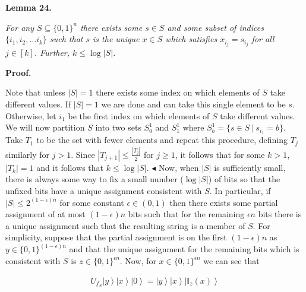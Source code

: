 

\par\medskip\noindent\textbf{
\textbf{Lemma 24}\textbf{.}
}\par



\emph{For any $S\subseteq\{0,1\}^{n}$ there exists some $s\in S$ and some subset of indices $\{i_{1},i_{2},\dots i_{k}\}$ such that $s$ is the unique $x\in S$ which satisfies
$x_{i_{j}}=s_{i_{j}}$ for all $j\in[k]$. Further, $k\leq\log{|S|}$.}\par







\par\medskip\noindent\textbf{Proof.}\par




Note that unless $|S|=1$ there exists some index on which elements of $S$ take different values. If $|S|=1$ we are done and can take this single element to be $s$. Otherwise, let $i_{1}$ be the first index on which elements of $S$ take different values. We will now partition $S$ into two sets $S^{1}_{0}$ and $S^{1}_{1}$ where $S^{1}_{b}=\{s\in S\ |\ s_{i_{1}}=b\}$. Take $T_{1}$ to be the set with fewer elements and repeat this procedure, defining $T_{j}$ similarly for $j>1$. Since $|T_{j+1}|\leq\frac{|T_{j}|}{2}$ for $j\geq 1$, it follows that for some $k>1$, $|T_{k}|=1$ and it follows that $k\leq\log{|S|}$.
$\blacktriangleleft$
Now, when $|S|$ is sufficiently small, there is always some way to fix a small number ($\log|S|$) of bits so that the unfixed bits have a unique assignment consistent with $S$. In particular, if $|S|\leq 2^{(1-\epsilon)n}$ for some constant $\epsilon\in(0,1)$ then there exists some partial assignment of at most $(1-\epsilon)n$ bits such that for the remaining $\epsilon n$ bits there is a unique assignment such that the resulting string is a member of $S$. For simplicity, suppose that the partial assignment is on the first $(1-\epsilon)n$ as $y\in\{0,1\}^{(1-\epsilon)n}$ and that the unique assignment for the remaining bits which is consistent with $S$ is $z\in\{0,1\}^{\epsilon n}$. Now, for $x\in\{0,1\}^{\epsilon n}$ we can see that\par


\[\begin{gathered}
\displaystyle U_{f_{S}}\left|y\right\rangle\left|x\right\rangle\left|0\right\rangle=\left|y\right\rangle\left|x\right\rangle\left|\mathbb{I}_{z}(x)\right\rangle
\end{gathered}\]


